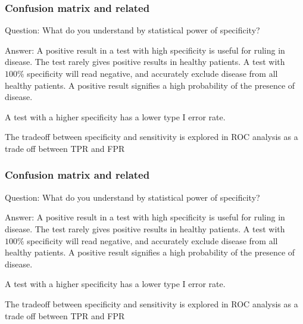 \documentclass[11pt]{beamer}
\begin{document}
\begin{frame}
\frametitle{Confusion matrix and related}
\begin{block}{Question:}
	What do you understand by statistical power of  specificity?
\end{block}
\begin{block}{Answer:}
	A positive result in a test with high specificity is useful for ruling in disease. The test rarely gives positive results in healthy patients. A test with $100\%$ specificity will read negative, and accurately exclude disease from all healthy patients. A positive result signifies a high probability of the presence of disease.
	
	A test with a higher specificity has a lower type I error rate.
	
	The tradeoff between specificity and sensitivity is explored in ROC analysis as a trade off between TPR and FPR
\end{block}
\end{frame}

\begin{frame}
\frametitle{Confusion matrix and related}
\begin{block}{Question:}
	What do you understand by statistical power of  specificity?
\end{block}
\begin{block}{Answer:}
	A positive result in a test with high specificity is useful for ruling in disease. The test rarely gives positive results in healthy patients. A test with $100\%$ specificity will read negative, and accurately exclude disease from all healthy patients. A positive result signifies a high probability of the presence of disease.
	
	A test with a higher specificity has a lower type I error rate.
	
	The tradeoff between specificity and sensitivity is explored in ROC analysis as a trade off between TPR and FPR
\end{block}
\end{frame}
\end{document}
